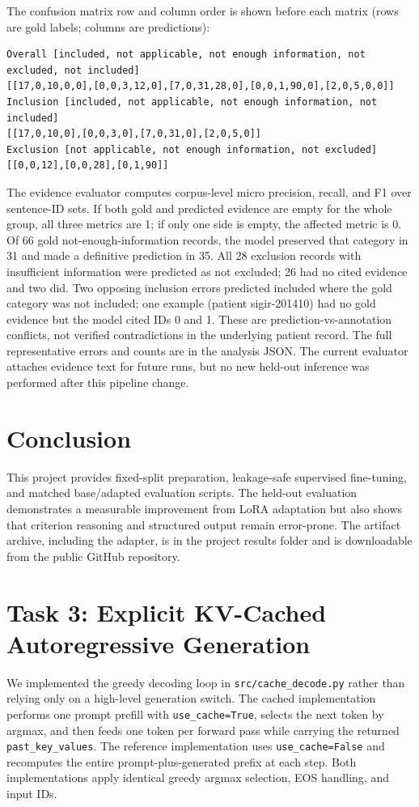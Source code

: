 \documentclass[conference]{IEEEtran}
\begin{document}
The confusion matrix row and column order is shown before each matrix (rows are gold labels; columns are predictions):
\begin{verbatim}
Overall [included, not applicable, not enough information, not excluded, not included]
[[17,0,10,0,0],[0,0,3,12,0],[7,0,31,28,0],[0,0,1,90,0],[2,0,5,0,0]]
Inclusion [included, not applicable, not enough information, not included]
[[17,0,10,0],[0,0,3,0],[7,0,31,0],[2,0,5,0]]
Exclusion [not applicable, not enough information, not excluded]
[[0,0,12],[0,0,28],[0,1,90]]
\end{verbatim}
The evidence evaluator computes corpus-level micro precision, recall, and F1 over sentence-ID sets. If both gold and predicted evidence are empty for the whole group, all three metrics are 1; if only one side is empty, the affected metric is 0. Of 66 gold not-enough-information records, the model preserved that category in 31 and made a definitive prediction in 35. All 28 exclusion records with insufficient information were predicted as not excluded; 26 had no cited evidence and two did. Two opposing inclusion errors predicted included where the gold category was not included; one example (patient sigir-201410) had no gold evidence but the model cited IDs 0 and 1. These are prediction-vs-annotation conflicts, not verified contradictions in the underlying patient record. The full representative errors and counts are in the analysis JSON. The current evaluator attaches evidence text for future runs, but no new held-out inference was performed after this pipeline change.
\section{Conclusion}
This project provides fixed-split preparation, leakage-safe supervised fine-tuning, and matched base/adapted evaluation scripts. The held-out evaluation demonstrates a measurable improvement from LoRA adaptation but also shows that criterion reasoning and structured output remain error-prone. The artifact archive, including the adapter, is in the project results folder and is downloadable from the public GitHub repository.
\section{Task 3: Explicit KV-Cached Autoregressive Generation}
\label{sec:kv-cache}
We implemented the greedy decoding loop in \texttt{src/cache\_decode.py} rather than relying only on a high-level generation switch. The cached implementation performs one prompt prefill with \texttt{use\_cache=True}, selects the next token by argmax, and then feeds one token per forward pass while carrying the returned \texttt{past\_key\_values}. The reference implementation uses \texttt{use\_cache=False} and recomputes the entire prompt-plus-generated prefix at each step. Both implementations apply identical greedy argmax selection, EOS handling, and input IDs.
\end{document}
